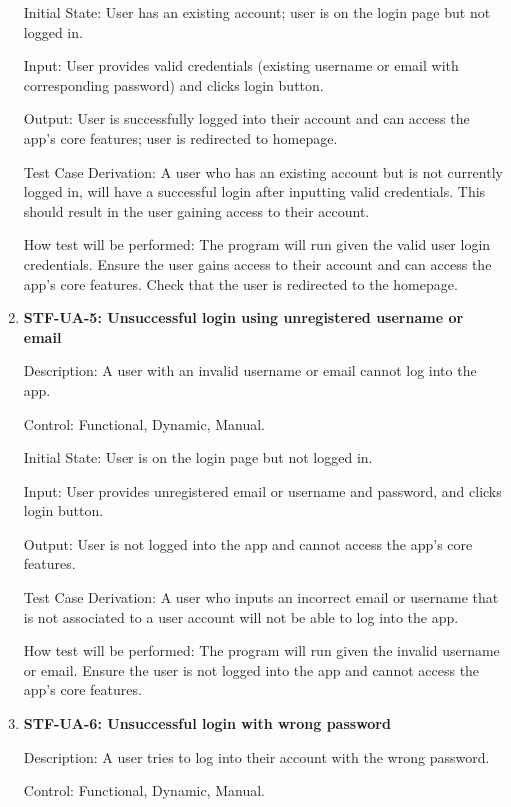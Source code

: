 \documentclass[12pt, titlepage]{article}
\begin{document}
\begin{enumerate}
        Initial State: User has an existing account; user is on the login page but not logged in.

        Input: User provides valid credentials (existing username or email with corresponding password) and clicks login button.

        Output: User is successfully logged into their account and can access the app’s core features; user is redirected to homepage.

        Test Case Derivation: A user who has an existing account but is not currently logged in, will have a successful login after inputting valid credentials. This should result in the user gaining access to their account.

        How test will be performed: The program will run given the valid user login credentials. Ensure the user gains access to their account and can access the app’s core features. Check that the user is redirected to the homepage.

        \item{\textbf{STF-UA-5: Unsuccessful login using unregistered username or email}\\}

        Description: A user with an invalid username or email cannot log into the app.

        Control:  Functional, Dynamic, Manual.

        Initial State: User is on the login page but not logged in.

        Input: User provides unregistered email or username and password, and clicks login button.

        Output: User is not logged into the app and cannot access the app’s core features.

        Test Case Derivation: A user who inputs an incorrect email or username that is not associated to a user account will not be able to log into the app.

        How test will be performed: The program will run given the invalid username or email. Ensure the user is not logged into the app and cannot access the app’s core features.

        \item{\textbf{STF-UA-6: Unsuccessful login with wrong password}\\}

        Description: A user tries to log into their account with the wrong password.

        Control:  Functional, Dynamic, Manual.


\end{enumerate}
\end{document}
